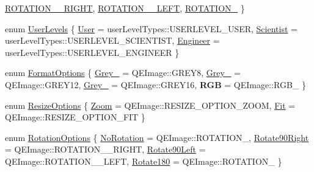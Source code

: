 \begin{DoxyCompactItemize}
\hyperlink{classQEImage_af3827d9fcef5cb397ac947e48558208aa807910e25cafc01a7a0bbc793f7e5085}{ROTATION\_\_\-RIGHT}, 
\hyperlink{classQEImage_af3827d9fcef5cb397ac947e48558208aa0c33aa8c410919baca934f780f74cdd0}{ROTATION\_\_\-LEFT}, 
\hyperlink{classQEImage_af3827d9fcef5cb397ac947e48558208aa03b8c428667cc3b0c8e43abaf7b21cda}{ROTATION\_}
 \}
\item 
enum \hyperlink{classQEImage_afc6169e5bb55dd0d3757ba09e3afe335}{UserLevels} \{ \hyperlink{classQEImage_afc6169e5bb55dd0d3757ba09e3afe335aa36c8539f2cdd9d20659c3fcdfb629dc}{User} =  userLevelTypes::USERLEVEL\_\-USER, 
\hyperlink{classQEImage_afc6169e5bb55dd0d3757ba09e3afe335aaa35e1668d3af0eae0e774a33faf7e14}{Scientist} =  userLevelTypes::USERLEVEL\_\-SCIENTIST, 
\hyperlink{classQEImage_afc6169e5bb55dd0d3757ba09e3afe335a87ef06e436d3f381379aa8b6ab45ce85}{Engineer} =  userLevelTypes::USERLEVEL\_\-ENGINEER
 \}
\item 
enum \hyperlink{classQEImage_a6595b537ab12bff146c508d0fcb3ae3b}{FormatOptions} \{ \hyperlink{classQEImage_a6595b537ab12bff146c508d0fcb3ae3ba6215820fb4dfe69742dfecc1f8c89c97}{Grey\_} =  QEImage::GREY8, 
\hyperlink{classQEImage_a6595b537ab12bff146c508d0fcb3ae3ba436edf8896bf0e162afaf8e7b0aafe03}{Grey\_} =  QEImage::GREY12, 
\hyperlink{classQEImage_a6595b537ab12bff146c508d0fcb3ae3baa002305c1b6235b4d2db5928b8a0a69f}{Grey\_} =  QEImage::GREY16, 
{\bfseries RGB} =  QEImage::RGB\_
 \}
\item 
enum \hyperlink{classQEImage_af9f3e6c8c2bbadf453a2354e7b14c615}{ResizeOptions} \{ \hyperlink{classQEImage_af9f3e6c8c2bbadf453a2354e7b14c615ae2430964584e02ae5f9a6cab8f1a5c26}{Zoom} =  QEImage::RESIZE\_\-OPTION\_\-ZOOM, 
\hyperlink{classQEImage_af9f3e6c8c2bbadf453a2354e7b14c615abdc647820939def6cf3b01c61f0e3b7d}{Fit} =  QEImage::RESIZE\_\-OPTION\_\-FIT
 \}
\item 
enum \hyperlink{classQEImage_a91596a1f020e3a40b106dcf82c3b7f9c}{RotationOptions} \{ \hyperlink{classQEImage_a91596a1f020e3a40b106dcf82c3b7f9ca53762d3f540e24dedd2b7d3d6e8e5794}{NoRotation} =  QEImage::ROTATION\_, 
\hyperlink{classQEImage_a91596a1f020e3a40b106dcf82c3b7f9cac95812735204bfb4707913407e048f43}{Rotate90Right} =  QEImage::ROTATION\_\_\-RIGHT, 
\hyperlink{classQEImage_a91596a1f020e3a40b106dcf82c3b7f9cad10c930e6158b632477d7607f78cf05a}{Rotate90Left} =  QEImage::ROTATION\_\_\-LEFT, 
\hyperlink{classQEImage_a91596a1f020e3a40b106dcf82c3b7f9caa195b97f7a15c64dc47ba28b15327ef0}{Rotate180} =  QEImage::ROTATION\_
 \}
\end{DoxyCompactItemize}
